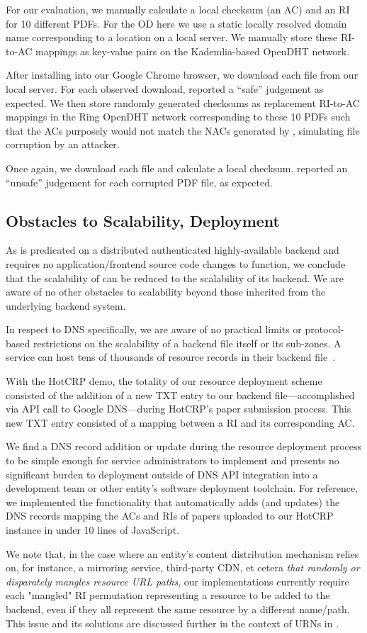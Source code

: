 For our evaluation, we manually calculate a local checksum (\ie an AC) and an RI
for 10 different \CONFERENCE{} PDFs. For the OD here we use a static locally
resolved domain name corresponding to a location on a local server. We manually
store these RI-to-AC mappings as key-value pairs on the Kademlia-based OpenDHT
network.

After installing \DHTSYS{} into our Google Chrome browser, we download each file
from our local server. For each observed download, \DHTSYS{} reported a ``safe''
judgement as expected. We then store randomly generated checksums as replacement
RI-to-AC mappings in the Ring OpenDHT network corresponding to these 10 PDFs
such that the ACs purposely would not match the NACs generated by \DHTSYS{},
simulating file corruption by an attacker.

Once again, we download each file and calculate a local checksum. \DHTSYS{}
reported an ``unsafe'' judgement for each corrupted PDF file, as expected.

\subsection{Obstacles to Scalability, Deployment}

As \SYSTEM{} is predicated on a distributed authenticated highly-available
backend and requires no application/frontend source code changes to function, we
conclude that the scalability of \SYSTEM{} can be reduced to the scalability of
its backend. We are aware of no other obstacles to scalability beyond those
inherited from the underlying backend system.

In respect to DNS specifically, we are aware of no practical limits or
protocol-based restrictions on the scalability of a backend file itself or its
sub-zones. A service can host tens of thousands of resource records in their
backend file~\cite{DNS1, DNS2}.

With the HotCRP demo, the totality of our resource deployment scheme consisted
of the addition of a new TXT entry to our backend file---accomplished via API
call to Google DNS---during HotCRP's paper submission process. This new TXT
entry consisted of a mapping between a RI and its corresponding AC.

We find a DNS record addition or update during the resource deployment process
to be simple enough for service administrators to implement and presents no
significant burden to deployment outside of DNS API integration into a
development team or other entity's software deployment toolchain. For reference,
we implemented the functionality that automatically adds (and updates) the DNS
records mapping the ACs and RIs of papers uploaded to our HotCRP instance in
under 10 lines of JavaScript.

We note that, in the case where an entity's content distribution mechanism
relies on, for instance, a mirroring service, third-party CDN, et cetera
\emph{that randomly or disparately mangles resource URL paths}, our
implementations currently require each "mangled" RI permutation representing a
resource to be added to the backend, even if they all represent the same
resource by a different name/path. This issue and its solutions are discussed
further in the context of URNs in .
